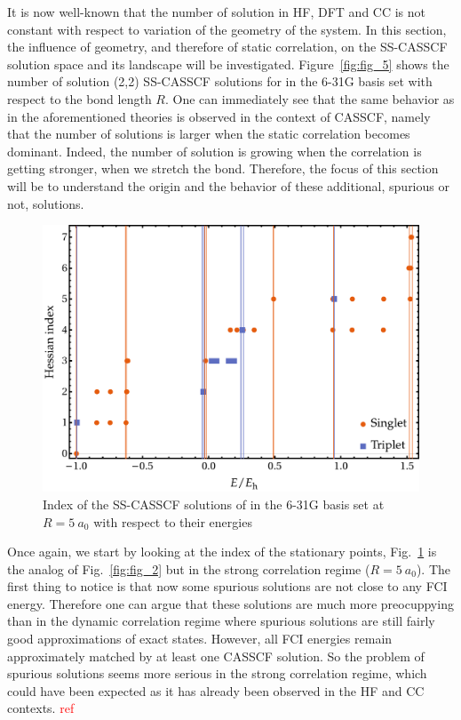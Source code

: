 \documentclass[aps,prb,reprint,showkeys,superscriptaddress]{revtex4-1}
\newcommand{\todo}[1]{\textcolor{red}{#1}}
\begin{document}
It is now well-known that the number of solution in HF, DFT and CC is not constant with respect to variation of the geometry of the system. \cite{Burton_2021}
In this section, the influence of geometry, and therefore of static correlation, on the SS-CASSCF solution space and its landscape will be investigated.
Figure~\ref{fig:fig_5} shows the number of solution (2,2) SS-CASSCF solutions for  in the 6-31G basis set with respect to the bond length $R$.
One can immediately see that the same behavior as in the aforementioned theories is observed in the context of CASSCF, namely that the number of solutions is larger when the static correlation becomes dominant.
Indeed, the number of solution is growing when the correlation is getting stronger, \ie when we stretch the bond.
Therefore, the focus of this section will be to understand the origin and the behavior of these additional, spurious or not, solutions.

\begin{figure}
  \includegraphics[width=0.9\linewidth]{Figures/fig_3b.pdf}
  \caption{Index of the SS-CASSCF solutions of  in the 6-31G basis set at $R=5~a_0$ with respect to their energies
    \label{fig:fig_6}}
\end{figure}

Once again, we start by looking at the index of the stationary points, Fig.~\ref{fig:fig_6} is the analog of Fig.~\ref{fig:fig_2} but in the strong correlation regime ($R=5~a_0$).
The first thing to notice is that now some spurious solutions are not close to any FCI energy.
Therefore one can argue that these solutions are much more preocuppying than in the dynamic correlation regime where spurious solutions are still fairly good approximations of exact states.
However, all FCI energies remain approximately matched by at least one CASSCF solution.
So the problem of spurious solutions seems more serious in the strong correlation regime, which could have been expected as it has already been observed in the HF and CC contexts. \todo{ref}
\end{document}
